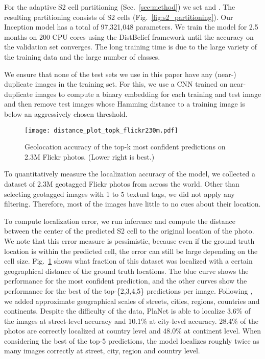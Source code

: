\documentclass[10pt,twocolumn,letterpaper]{article}
\begin{document}
For the adaptive S2 cell partitioning (Sec.~\ref{sec:method}) we set 
and . The
resulting partitioning consists of  S2 cells
(Fig.~\ref{fig:s2_partitioning}). Our Inception model has a total of
97,321,048 parameters.
We train the model for 2.5 months on 200 CPU cores using the DistBelief framework \cite{Dean12NIPS} until the accuracy on the validation set converges. The long training time
is due to the large variety of the training data and the large
number of classes.

We ensure that none of the test sets we use in this paper have any (near-) duplicate images in the training set. For this, we use a CNN trained on near-duplicate images to compute a binary embedding for each training and test image and then remove test images whose Hamming distance to a training image is below an aggressively chosen threshold. 

\begin{figure}[t]
  \centering
 \texttt{[image: distance\_plot\_topk\_flickr230m.pdf]}
 \caption{Geolocation accuracy of the top-k most confident predictions on 2.3M Flickr photos. (Lower right is best.)}
  \label{fig:flickr230m_plot}
\end{figure}
To quantitatively measure the localization accuracy of the model, we collected a dataset of 2.3M geotagged Flickr photos from across the world. Other than selecting geotagged images with 1 to 5 textual tags, we did not apply any filtering. Therefore, most of the images have little to no cues about their location.

To compute localization error, we run inference and compute the distance between the center of the predicted S2 cell to the original location of the photo. We note that this error measure is pessimistic, because even if the ground truth location is within the predicted cell, the error can still be large depending on the cell size.
Fig.~\ref{fig:flickr230m_plot} shows what fraction of this dataset was localized with a certain geographical distance of the ground truth locations. The blue curve shows the performance for the most confident prediction, and the other curves show the performance for the best of the top-\{2,3,4,5\} predictions per image. Following \cite{Hays14MLEVI}, we added approximate geographical scales of streets, cities, regions, countries and continents.
Despite the difficulty of the data, PlaNet is able to localize 3.6\% of the images at street-level accuracy and 10.1\% at city-level accuracy. 28.4\% of the photos are correctly localized at country level and 48.0\% at continent level. When considering the best of the top-5 predictions, the model localizes roughly twice as many images correctly at street, city, region and country level.  
\end{document}
